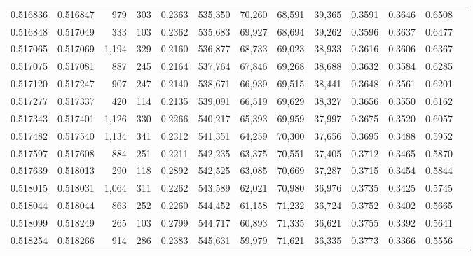 \begin{tabular}{rrrrrrrrrrrrr}
0.516836 & 0.516847 &   979 &   303 &                                     0.2363 & 535,350 &  70,260 &  68,591 &  39,365 & 0.3591 & 0.3646 & 0.6508 \\
0.516848 & 0.517049 &   333 &   103 &                                     0.2362 & 535,683 &  69,927 &  68,694 &  39,262 & 0.3596 & 0.3637 & 0.6477 \\
0.517065 & 0.517069 & 1,194 &   329 &                                     0.2160 & 536,877 &  68,733 &  69,023 &  38,933 & 0.3616 & 0.3606 & 0.6367 \\
0.517075 & 0.517081 &   887 &   245 &                                     0.2164 & 537,764 &  67,846 &  69,268 &  38,688 & 0.3632 & 0.3584 & 0.6285 \\
0.517120 & 0.517247 &   907 &   247 &                                     0.2140 & 538,671 &  66,939 &  69,515 &  38,441 & 0.3648 & 0.3561 & 0.6201 \\
0.517277 & 0.517337 &   420 &   114 &                                     0.2135 & 539,091 &  66,519 &  69,629 &  38,327 & 0.3656 & 0.3550 & 0.6162 \\
0.517343 & 0.517401 & 1,126 &   330 &                                     0.2266 & 540,217 &  65,393 &  69,959 &  37,997 & 0.3675 & 0.3520 & 0.6057 \\
0.517482 & 0.517540 & 1,134 &   341 &                                     0.2312 & 541,351 &  64,259 &  70,300 &  37,656 & 0.3695 & 0.3488 & 0.5952 \\
0.517597 & 0.517608 &   884 &   251 &                                     0.2211 & 542,235 &  63,375 &  70,551 &  37,405 & 0.3712 & 0.3465 & 0.5870 \\
0.517639 & 0.518013 &   290 &   118 &                                     0.2892 & 542,525 &  63,085 &  70,669 &  37,287 & 0.3715 & 0.3454 & 0.5844 \\
0.518015 & 0.518031 & 1,064 &   311 &                                     0.2262 & 543,589 &  62,021 &  70,980 &  36,976 & 0.3735 & 0.3425 & 0.5745 \\
0.518044 & 0.518044 &   863 &   252 &                                     0.2260 & 544,452 &  61,158 &  71,232 &  36,724 & 0.3752 & 0.3402 & 0.5665 \\
0.518099 & 0.518249 &   265 &   103 &                                     0.2799 & 544,717 &  60,893 &  71,335 &  36,621 & 0.3755 & 0.3392 & 0.5641 \\
0.518254 & 0.518266 &   914 &   286 &                                     0.2383 & 545,631 &  59,979 &  71,621 &  36,335 & 0.3773 & 0.3366 & 0.5556 \\

\end{tabular}
